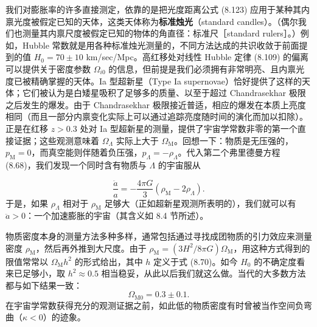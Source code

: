 我们对膨胀率的许多直接测定，依靠的是把光度距离公式 (8.123) 应用于某种其内禀光度被假定已知的天体，这类天体称为\textbf{标准烛光}（standard candles）。（偶尔我们也测量其内禀尺度被假定已知的物体的角直径：标准尺［standard rulers］。）例如，Hubble 常数就是用各种标准烛光测量的，不同方法达成的共识收敛于前面提到的值 $H_0=70\pm 10$ km/sec/Mpc。高红移处对线性 Hubble 定律 (8.109) 的偏离可以提供关于密度参数 $\Omega_{i0}$ 的信息，但前提是我们必须拥有非常明亮、且内禀光度已被精确掌握的天体。Ia 型超新星（Type Ia supernovae）恰好提供了这样的天体；它们被认为是白矮星吸积了足够多的质量、以至于超过 Chandrasekhar 极限之后发生的爆发。由于 Chandrasekhar 极限接近普适，相应的爆发在本质上亮度相同（而且一部分内禀变化实际上可以通过追踪亮度随时间的演化而加以扣除）。正是在红移 $z>0.3$ 处对 Ia 型超新星的测量，提供了宇宙学常数非零的第一个直接证据；这些观测意味着 $\Omega_{\Lambda}$ 实际上大于 $\Omega_{\mathrm{M}}$。回想一下：物质是无压强的，$p_{\mathrm{M}}=0$，而真空能则伴随着负压强，$p_{\Lambda}=-\rho_{\Lambda}$。代入第二个弗里德曼方程 (8.68)，我们发现一个同时含有物质与 $\Lambda$ 的宇宙服从

\begin{equation*}
\frac{\ddot{a}}{a} = -\frac{4\pi G}{3}(\rho_{\mathrm{M}} - 2\rho_{\Lambda}).
\tag{8.155}
\end{equation*}
于是，如果 $\rho_{\Lambda}$ 相对于 $\rho_{\mathrm{M}}$ 足够大（正如超新星观测所表明的），我们就可以有 $\ddot{a}>0$：一个加速膨胀的宇宙（其含义如 8.4 节所述）。

物质密度本身的测量方法多种多样，通常包括通过寻找成团物质的引力效应来测量密度 $\rho_{\mathrm{M}}$，然后再外推到大尺度。由于 $\rho_{\mathrm{M}}=(3H^{2}/8\pi G)\Omega_{\mathrm{M}}$，用这种方式得到的限值常常以 $\Omega_{\mathrm{M}}h^{2}$ 的形式给出，其中 $h$ 定义于式 (8.70)。如今 $H_0$ 的不确定度看来已足够小，取 $h^{2}\approx 0.5$ 相当稳妥，从此以后我们就这么做。当代的大多数方法都与如下结果一致：
\begin{equation*}
\Omega_{\mathrm{M}0} = 0.3\pm 0.1.
\tag{8.156}
\end{equation*}
在宇宙学常数获得充分的观测证据之前，如此低的物质密度有时曾被当作空间负弯曲（$\kappa<0$）的迹象。

